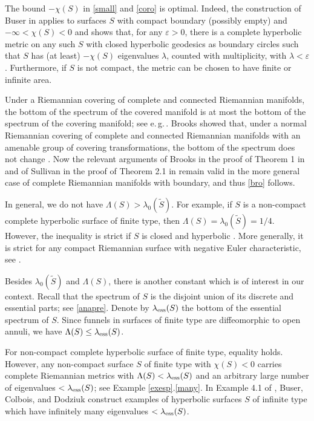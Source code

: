 \begin{rems}\label{rems}
\begin{inparaenum}[1)]
\item\label{buse}
The bound $-\chi(S)$ in \cref{small} and \cref{coro} is optimal.
Indeed, the construction of Buser in \cite{Bu1} applies to surfaces $S$
with compact boundary (possibly empty) and $-\infty<\chi(S)<0$
and shows that, for any ${\varepsilon}>0$, there is a complete hyperbolic metric
on any such $S$ with closed hyperbolic geodesics as boundary circles
such that $S$ has (at least) $-\chi(S)$ eigenvalues $\lambda$,
counted with multiplicity, with $\lambda<{\varepsilon}$.
Furthermore, if $S$ is not compact,
the metric can be chosen to have finite or infinite area.

\item\label{broo}
Under a Riemannian covering of complete and connected Riemannian manifolds,
the bottom of the spectrum of the covered manifold is at most the bottom of the spectrum
of the covering manifold; see e.\,g.\,\cite[p.\,101]{Br2}.
Brooks showed that, under a normal Riemannian covering of complete and connected
Riemannian manifolds with an amenable group of covering transformations,
the bottom of the spectrum does not change \cite[Theorem 1]{Br2}.
Now the relevant arguments of Brooks in the proof of Theorem 1 in \cite{Br2}
and of Sullivan in the proof of Theorem 2.1 in \cite{Su} remain valid
in the more general case of complete Riemannian manifolds with boundary,
and thus \eqref{bro} follows.

In general, we do not have $\Lambda(S)>\lambda_0(\tilde S)$.
For example, if $S$ is a non-compact complete hyperbolic surface of finite type,
then $\Lambda(S)=\lambda_0(\tilde S)=1/4$.
However, the inequality is strict if $S$ is closed and hyperbolic \cite{Mo}.
More generally, it is strict for any compact Riemannian surface
with negative Euler characteristic, see \cite{BMM2}.

\item\label{ess}
Besides $\lambda_0(\tilde S)$ and $\Lambda(S)$,
there is another constant which is of interest in our context.
Recall that the spectrum of $S$ is the disjoint union
of its discrete and essential parts; see \cref{anapre}.
Denote by $\lambda_{\rm ess}(S)$ the bottom of the essential spectrum of $S$.
Since funnels in surfaces of finite type are diffeomorphic to open annuli,
we have $\Lambda(S)\le\lambda_{\rm ess}(S)$.

For non-compact complete hyperbolic surface of finite type, equality holds.
However, any non-compact surface $S$ of finite type with $\chi(S)<0$
carries complete Riemannian metrics with $\Lambda(S)<\lambda_{\rm ess}(S)$
and an arbitrary large number of eigenvalues $<\lambda_{\rm ess}(S)$;
see Example \ref{exesp}.\ref{many}.
In Example 4.1 of \cite{BCD}, Buser, Colbois, and Dodziuk construct examples
of hyperbolic surfaces $S$ of infinite type which have infinitely many
eigenvalues $<\lambda_{\rm ess}(S)$.


\end{inparaenum}
\end{rems}
